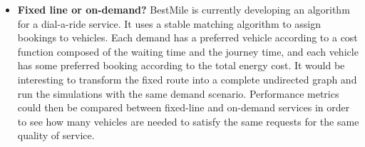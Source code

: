 \documentclass[12pt,a4paper]{article}
\begin{document}
\begin{itemize}
\item \textbf{Fixed line or on-demand?} BestMile is currently developing an algorithm for a dial-a-ride service. It uses a stable matching algorithm to assign bookings to vehicles. Each demand has a preferred vehicle according to a cost function composed of the waiting time and the journey time, and each vehicle has some preferred booking according to the total energy cost. It would be interesting to transform the fixed route into a complete undirected graph and run the simulations with the same demand scenario. Performance metrics could then be compared between fixed-line and on-demand services in order to see how many vehicles are needed to satisfy the same requests for the same quality of service. 
\end{itemize}


\newpage


\end{document}
